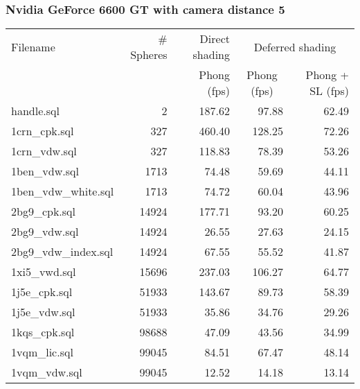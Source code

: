 \subsubsection*{Nvidia GeForce 6600 GT with camera distance 5}
\begin{tabular}{|l|r|r|r|r|}
\hline
Filename & \# Spheres & Direct shading & \multicolumn{2}{|c|}{Deferred shading} \\
         &            & Phong (fps)    & \multicolumn{1}{|c}{Phong (fps)} & Phong + SL (fps) \\  
\hline
\hline
handle.sql & 2 & 187.62 & 97.88 & 62.49 \\
\hline
1crn\_cpk.sql & 327 & 460.40 & 128.25 & 72.26 \\
\hline
1crn\_vdw.sql & 327 & 118.83 & 78.39 & 53.26 \\
\hline
1ben\_vdw.sql & 1713 & 74.48 & 59.69 & 44.11 \\
\hline
1ben\_vdw\_white.sql & 1713 & 74.72 & 60.04 & 43.96 \\
\hline
2bg9\_cpk.sql & 14924 & 177.71 & 93.20 & 60.25 \\
\hline
2bg9\_vdw.sql & 14924 & 26.55 & 27.63 & 24.15 \\
\hline
2bg9\_vdw\_index.sql & 14924 & 67.55 & 55.52 & 41.87 \\
\hline
1xi5\_vwd.sql & 15696 & 237.03 & 106.27 & 64.77 \\
\hline
1j5e\_cpk.sql & 51933 & 143.67 & 89.73 & 58.39 \\
\hline
1j5e\_vdw.sql & 51933 & 35.86 & 34.76 & 29.26 \\
\hline
1kqs\_cpk.sql & 98688 & 47.09 & 43.56 & 34.99 \\
\hline
1vqm\_lic.sql & 99045 & 84.51 & 67.47 & 48.14 \\
\hline
1vqm\_vdw.sql & 99045 & 12.52 & 14.18 & 13.14 \\
\hline
\end{tabular}
